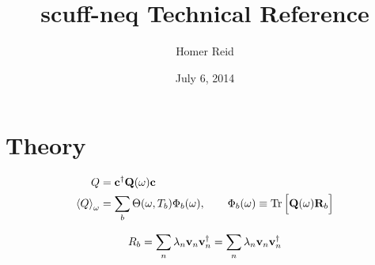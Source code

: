 \documentclass[letterpaper]{article}
\title {{\sc scuff-neq} Technical Reference}
\author {Homer Reid}
\date {July 6, 2014}
\begin{document}
\pagestyle{myheadings}
\maketitle

\tableofcontents

\newpage
\section{Theory}

\begin{align*}
 Q &=  \mathbf{c}^\dagger \mathbf{Q}(\omega) \mathbf{c}
\\
 \left\langle Q \right\rangle_\omega
   &= \sum_b \Theta(\omega, T_b)\Phi_b(\omega), \qquad  
\Phi_b(\omega) \equiv \mathop{\mathrm{Tr}}\nolimits \Big[ \mathbf{Q}(\omega)\mathbf{R}_b \Big]
\end{align*}

$$ R_b=\sum_{n} \lambda_n \mathbf{v}_n \mathbf{v}_n^\dagger \\
   =\sum_{n} \lambda_n \mathbf{v}_n \mathbf{v}_n^\dagger \\
$$
\end{document}
